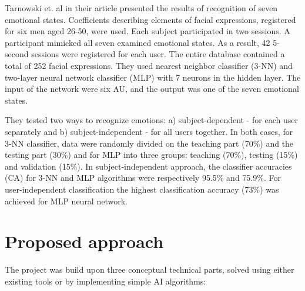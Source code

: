 \documentclass[runningheads,a4paper,11pt]{report}
\begin{document}
Tarnowski et. al in their article presented the results of recognition of seven emotional states. Coefficients describing elements of facial expressions, registered for six men aged 26-50, were used.
Each subject participated in two sessions. A participant mimicked all seven examined emotional states. As a result, 42 5-second sessions were registered for each user. The entire database contained a total of 252 facial expressions. \cite{Tarnowski17}
They used nearest neighbor classifier (3-NN) and two-layer neural network classifier (MLP) with 7 neurons in the hidden layer.
The input of the network were six AU, and the output was one of the seven emotional states.

They tested two ways to recognize emotions: a) subject-dependent - for each user separately and b) subject-independent - for all users together. In both cases, for 3-NN classifier, data were randomly divided on the teaching part (70\%) and the testing part (30\%) and for MLP into three groups: teaching (70\%), testing (15\%) and validation (15\%).
In subject-independent approach, the classifier accuracies (CA) for 3-NN and MLP algorithms were respectively 95.5\% and 75.9\%.
For user-independent classification the highest classification accuracy (73\%) was achieved for MLP neural network. \cite{Tarnowski17}




\chapter{Proposed approach}
\label{chapter:proposedApproach}

The project was build upon three conceptual technical parts, solved using either existing tools or by implementing simple AI algorithms:
\end{document}
